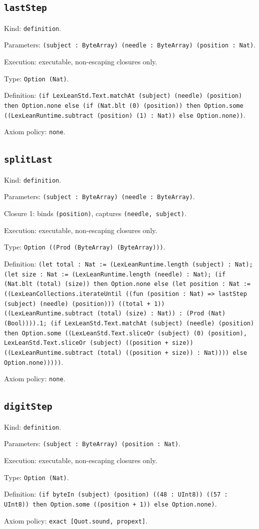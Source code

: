 \documentclass[11pt]{article}
\begin{document}
\subsection*{\texttt{lastStep}}
\noindent Kind: \texttt{definition}.\par
\noindent Parameters: \texttt{(subject : ByteArray) (needle : ByteArray) (position : Nat)}.\par
\noindent Execution: executable, non-escaping closures only.\par
\noindent Type: \texttt{Option (Nat)}.\par
\noindent Definition: \texttt{(if LexLeanStd.Text.matchAt (subject) (needle) (position) then Option.none else (if (Nat.blt (0) (position)) then Option.some ((LexLeanRuntime.subtract (position) (1) : Nat)) else Option.none))}.\par
\noindent Axiom policy: \texttt{none}.\par
\subsection*{\texttt{splitLast}}
\noindent Kind: \texttt{definition}.\par
\noindent Parameters: \texttt{(subject : ByteArray) (needle : ByteArray)}.\par
\noindent Closure 1: binds \texttt{(position)}, captures \texttt{(needle, subject)}.\par
\noindent Execution: executable, non-escaping closures only.\par
\noindent Type: \texttt{Option ((Prod (ByteArray) (ByteArray)))}.\par
\noindent Definition: \texttt{(let total : Nat := (LexLeanRuntime.length (subject) : Nat); (let size : Nat := (LexLeanRuntime.length (needle) : Nat); (if (Nat.blt (total) (size)) then Option.none else (let position : Nat := ((LexLeanCollections.iterateUntil ((fun (position : Nat) => lastStep (subject) (needle) (position))) ((total + 1)) ((LexLeanRuntime.subtract (total) (size) : Nat)) : (Prod (Nat) (Bool)))).1; (if LexLeanStd.Text.matchAt (subject) (needle) (position) then Option.some ((LexLeanStd.Text.sliceOr (subject) (0) (position), LexLeanStd.Text.sliceOr (subject) ((position + size)) ((LexLeanRuntime.subtract (total) ((position + size)) : Nat)))) else Option.none)))))}.\par
\noindent Axiom policy: \texttt{none}.\par
\subsection*{\texttt{digitStep}}
\noindent Kind: \texttt{definition}.\par
\noindent Parameters: \texttt{(subject : ByteArray) (position : Nat)}.\par
\noindent Execution: executable, non-escaping closures only.\par
\noindent Type: \texttt{Option (Nat)}.\par
\noindent Definition: \texttt{(if byteIn (subject) (position) ((48 : UInt8)) ((57 : UInt8)) then Option.some ((position + 1)) else Option.none)}.\par
\noindent Axiom policy: \texttt{exact [Quot.sound, propext]}.\par
\end{document}
